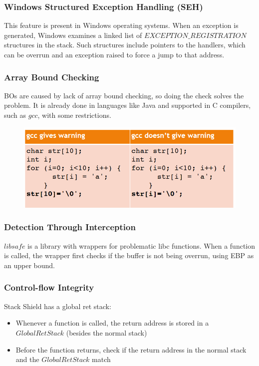 \documentclass[10pt,a4paper]{report}
\begin{document}
\subsubsection{Windows Structured Exception Handling (SEH)}
This feature is present in Windows operating systems. When an exception is generated, Windows examines a linked list of $EXCEPTION\_REGISTRATION$ structures in the stack. Such structures include pointers to the handlers, which  can be overrun and an exception raised to force a jump to that address.
\subsubsection{Array Bound Checking}
BOs are caused by lack of array bound checking, so doing the check solves the problem. It is already done in languages like Java and supported in C compilers, such as $gcc$, with some restrictions.
\begin{figure}[H]
\centering
\includegraphics[scale=0.4]{16.png}
\end{figure}
\subsubsection{Detection Through Interception}
$libsafe$ is a library with wrappers for problematic libc functions. When a function is called, the wrapper first checks if the buffer is not being overrun, using EBP as an upper bound.
\subsubsection{Control-flow Integrity}
Stack Shield has a global ret stack:
\begin{itemize}
\item Whenever a function is called, the return address is stored in a $GlobalRetStack$ (besides the normal stack)
\item Before the function returns, check if the return address in the normal stack and the $GlobalRetStack$ match
\end{itemize}
\end{document}

